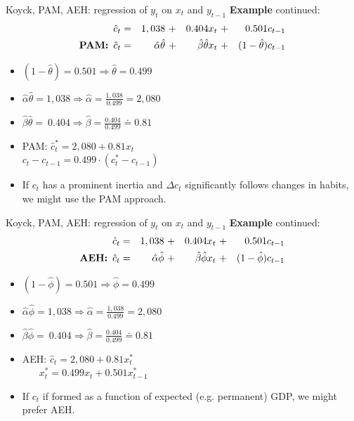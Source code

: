 \documentclass{beamer}
\begin{document}

\begin{frame}{Koyck, PAM, AEH: regression of $y_t$ on $x_t$ and $y_{t-1}$}
\textbf{Example} continued:
\begin{equation*}
\begin{aligned}
\hat{c}_t & = &1,038~&+ &0.404 x_t~ &+ &0.501 c_{t-1} \\
\textnormal{\textbf{PAM:}} \,\,\, \hat{c}_t& = &\hat{\alpha} \hat{\theta}~&+ &\hat{\beta} \hat{\theta} x_t~&+ &(1-\hat{\theta}) c_{t-1} 
\end{aligned}
\end{equation*}

\begin{itemize}
\item $(1-\hat{\theta})=0.501 \Rightarrow \hat{\theta} = 0.499$
\smallskip
\item $\hat{\alpha} \hat{\theta} = 1,038 \Rightarrow \hat{\alpha}= \frac{1,038}{0.499}=2,080$
\item $\hat{\beta} \hat{\theta} = ~ 0.404 \Rightarrow \hat{\beta}= \frac{0.404}{0.499} \doteq 0.81$
\bigskip
\item PAM: $\hat{c}_t^{\ast} = 2,080 + 0.81 x_t$\\
\smallskip
$c_t - c_{t-1} = 0.499 \cdot (c_t^{\ast}-c_{t-1})$
\bigskip
\item If $c_t$ has a prominent inertia and $\Delta c_t$ significantly follows changes in habits, we might use the PAM approach.
\end{itemize}
\end{frame}


\begin{frame}{Koyck, PAM, AEH: regression of $y_t$ on $x_t$ and $y_{t-1}$}
\textbf{Example} continued:
\begin{equation*}
\begin{aligned}
\hat{c}_t & = &1,038~&+ &0.404 x_t~ &+ &0.501 c_{t-1} \\
\textnormal{\textbf{AEH:}} \,\,\, \hat{c}_t& = &\hat{\alpha} \hat{\phi}~&+ &\hat{\beta} \hat{\phi} x_t~&+ &(1-\hat{\phi}) c_{t-1} 
\end{aligned}
\end{equation*}

\begin{itemize}
\item $(1-\hat{\phi})=0.501 \Rightarrow \hat{\phi} = 0.499$
\smallskip
\item $\hat{\alpha} \hat{\phi} = 1,038 \Rightarrow \hat{\alpha}= \frac{1,038}{0.499}=2,080$
\item $\hat{\beta} \hat{\phi} = ~ 0.404 \Rightarrow \hat{\beta}= \frac{0.404}{0.499} \doteq 0.81$
\bigskip
\item AEH: $\hat{c}_t = 2,080 + 0.81 x_t^{\ast}$\\
\smallskip
$~~~~~~~\,x_t^{\ast} = 0.499 x_t + 0.501 x_{t-1}^{\ast}$
\bigskip
\item If $c_t$ if formed as a function of expected (e.g. permanent) GDP, we might prefer AEH.
\end{itemize}
\end{frame}
\end{document}
